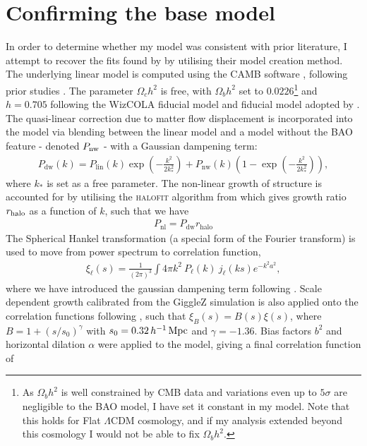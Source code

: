 \documentclass[titlesmallcaps, examinerscopy, copyrightpage]{uqthesis}
\begin{document}
\section{Confirming the base model}

In order to determine whether my model was consistent with prior literature, I attempt to recover the fits found by \citet{BlakeKazin2011} by utilising their model creation method. The underlying linear model is computed using the CAMB software \citep{Lewis2000}, following prior studies \citep{BlakeDavis2011, SanchezScoccola2012, ChuangWang2012}. The parameter $\Omega_c h^2$ is free, with $\Omega_b h^2$ set to $0.0226$\footnote{As $\Omega_b h^2$ is well constrained by CMB data and variations even up to $5\sigma$ are negligible to the BAO model, I have set it constant in my model. Note that this holds for Flat $\Lambda$CDM cosmology, and if my analysis extended beyond this cosmology I would not be able to fix $\Omega_b h^2$.} and $h=0.705$ following the WizCOLA fiducial model and fiducial model adopted by \citet{BlakeKazin2011}. The quasi-linear correction due to matter flow displacement is incorporated into the model via blending between the linear model and a model without the BAO feature - denoted $P_{\rm{nw}}$ - with a Gaussian dampening term:
\begin{align}
P_{\text{dw}}(k) = P_{\text{lin}}(k) \exp\left(-\frac{k^2}{2k_*^2}\right)  + P_{\text{nw}}(k) \left(1 - \exp\left(-\frac{k^2}{2k_*^2}\right)\right),
\end{align}
where $k_*$ is set as a free parameter. The non-linear growth of structure is accounted for by utilising the \textsc{halofit} algorithm from \citet{Smith2003} which gives growth ratio $r_{\rm{halo}}$ as a function of $k$, such that we have
\begin{align}
P_{\text{nl}} = P_{\text{dw}} r_{\text{halo}}
\end{align}
The Spherical Hankel transformation (a special form of the Fourier transform) is used to move from power spectrum to correlation function,
\begin{align}
\xi_\ell(s) = \frac{1}{(2\pi)^3} \int 4\pi k^2 \ P_\ell(k) \ j_\ell(ks) e^{-k^2 a^2},
\end{align}
where we have introduced the gaussian dampening term following \citet{AndersonAubourg2012}. Scale dependent growth calibrated from the GiggleZ simulation is also applied onto the correlation functions following \citet{BlakeDavis2011}, such that $\xi_B(s) = B(s) \xi(s)$, where $B = 1 + (s/s_0)^\gamma$ with $s_0 = 0.32\, h^{-1}\,\rm{Mpc}$ and $\gamma = -1.36$. Bias factors $b^2$ and horizontal dilation $\alpha$ were applied to the model, giving a final correlation function of 
\end{document}
